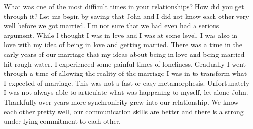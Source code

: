 What was one of the most difficult times in your relationships? How did you get through it?
Let me begin by saying that John and I did not know each other very well before we got married.
I'm not sure that we had even had a serious argument.
While I thought I was in love and I was at some level, I was also in love with my idea of being in love and getting married.
There was a time in the early years of our marriage that my ideas about being in love and being married hit rough water.
I experienced some painful times of loneliness.
Gradually I went through a time of allowing the reality of the marriage I was in to transform what I expected of marriage.
This was not a fast or easy metamorphosis.
Unfortunately I was not always able to articulate what was happening to myself, let alone John.
Thankfully over years more synchronicity grew into our relationship.
We know each other pretty well, our communication skills are better and there is a strong under lying commitment to each other.





